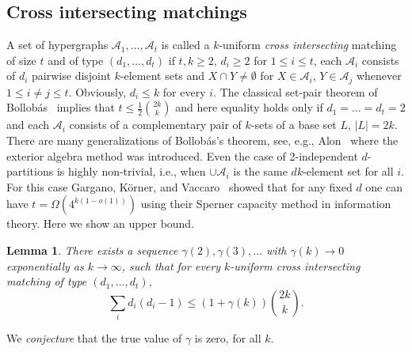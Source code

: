 \documentclass[12pt,a4paper]{amsart}
\numberwithin{equation}{section}
\theoremstyle{plain}
\newtheorem{Lemma}[Th]{Lemma}
\theoremstyle{definition}
\def\cA{{\mathcal{A}}}
\begin{document}
\subsection{Cross intersecting matchings}\label{ss_cross}

A set of hypergraphs $\cA_1, \dots, \cA_t$ is called a $k$-uniform {\em cross intersecting} matching of size $t$ and of type $(d_1, \dots,  d_t)$
 if $t,k\geq 2$, $d_i \geq 2$ for $1 \leq i \leq t$, each $\cA_i$ consists of $d_i$ pairwise disjoint $k$-element sets and $X\cap Y\neq \emptyset$ for
 $X\in \cA_i$, $Y\in \cA_{j}$ whenever $1\leq i\neq j\leq t$. Obviously, $d_i\leq k$ for every $i$.
The classical set-pair theorem of Bollob\'as~\cite{bollobas1965generalized} implies that $t\leq \frac{1}{2}\binom{2k}{k}$ and here equality holds only if $d_1=\dots =d_t=2$ and each $\cA_i$ consists of a complementary pair of $k$-sets of a base set $L$, $|L|=2k$.
There are many generalizations of Bollob\'as's theorem, see, e.g., Alon~\cite{Alon85} where the exterior algebra method was introduced. Even the case of 2-independent $d$-partitions is highly non-trivial, i.e., when $\cup \cA_i$ is the same $dk$-element set for all $i$. For this case Gargano, K\"orner, and Vaccaro~\cite{KornerJ} showed that for any fixed $d$ one can have $t= \Omega( 4^{k(1-o(1))})$
using their Sperner capacity method in information theory.
Here we show an upper bound.

\begin{Lemma}\label{cross-int}
There exists a sequence $\gamma(2), \gamma(3), \ldots$ with $\gamma(k) \to 0$ exponentially as $k \to \infty$, such that for every $k$-uniform cross intersecting matching of type $(d_1, \dots, d_t)$,
\begin{equation}\label{eq221}
  \sum_i d_i(d_i-1) \leq (1+ \gamma(k))\binom{2k}{k}.
\end{equation}
\end{Lemma}

We {\em conjecture} that the true value of $\gamma$ is zero, for all $k$.
\end{document}

